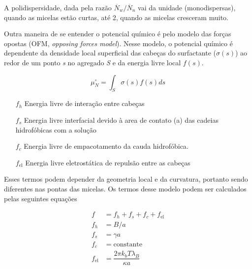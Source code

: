 		A polidispersidade, dada pela razão \(\overline{N}_w / \overline{N}_n\) vai da unidade (monodispersas), quando as micelas estão curtas, até 2, quando as micelas cresceram muito. 
		
		Outra maneira de se entender o potencial químico é pelo modelo das forças opostas (OFM, \emph{opposing forces model}). Nesse modelo, o potencial químico é dependente da densidade local superficial das cabeças do surfactante (\(\sigma(s)\)) ao redor de um ponto \emph{s} no agregado \emph{S} e da energia livre local \(f(s)\).
		
		\begin{equation}
		\mu_N^\circ = \int_S \sigma(s) f(s) ds
		\label{eqn:OFM_potencial_quimico}
		\end{equation} 		%
		
		
		\begin{itemize}
			\item[\(f_h\)] Energia livre de interação entre cabeças
			\item[\(f_s\)] Energia livre interfacial devido à area de contato (a) das cadeias hidrofóbicas com a solução
			\item[\(f_c\)] Energia livre de empacotamento da cauda hidrofóbica.
			\item[\(f_\mathrm{el}\)] Energia livre eletrostática de repulsão entre as cabeças
		\end{itemize}
		
		Esses termos podem depender da geometria local e da curvatura, portanto sendo diferentes nas pontas das micelas. Os termos desse modelo podem ser calculados pelas seguintes equações
		
		\begin{subequations}
			\begin{align}
				f   &= f_h + f_s + f_c + f_\mathrm{el} \\
				f_h &= B / a     \\
				f_s &= \gamma a  \\
				f_c &= \mathrm{constante}  \\
				f_\mathrm{el} &= \dfrac{2\pi k_bT\lambda_B}{\kappa a}
			\end{align}
			\label{eqn:componentes_OFM}
		\end{subequations}
		

